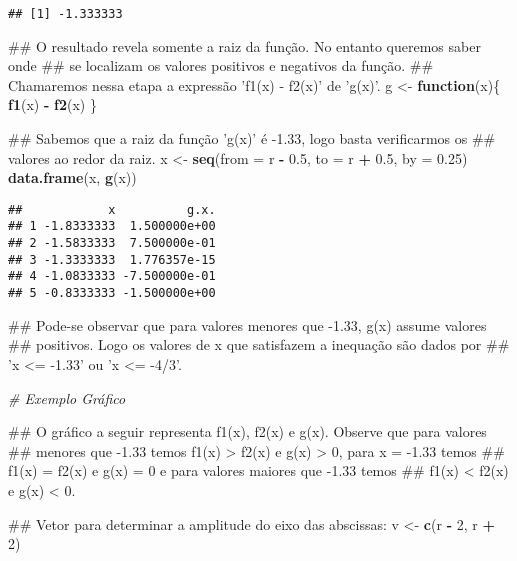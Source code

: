 \documentclass[]{book}
\newenvironment{Shaded}{\begin{snugshade}}{\end{snugshade}}
\newcommand{\KeywordTok}[1]{\textcolor[rgb]{0.13,0.29,0.53}{\textbf{#1}}}
\newcommand{\DataTypeTok}[1]{\textcolor[rgb]{0.13,0.29,0.53}{#1}}
\newcommand{\DecValTok}[1]{\textcolor[rgb]{0.00,0.00,0.81}{#1}}
\newcommand{\FloatTok}[1]{\textcolor[rgb]{0.00,0.00,0.81}{#1}}
\newcommand{\StringTok}[1]{\textcolor[rgb]{0.31,0.60,0.02}{#1}}
\newcommand{\CommentTok}[1]{\textcolor[rgb]{0.56,0.35,0.01}{\textit{#1}}}
\newcommand{\ControlFlowTok}[1]{\textcolor[rgb]{0.13,0.29,0.53}{\textbf{#1}}}
\newcommand{\OperatorTok}[1]{\textcolor[rgb]{0.81,0.36,0.00}{\textbf{#1}}}
\newcommand{\NormalTok}[1]{#1}
\begin{document}
\begin{enumerate}
\begin{verbatim}
## [1] -1.333333
\end{verbatim}

\begin{Shaded}
\begin{Highlighting}[]
\NormalTok{##  O resultado revela somente a raiz da função. No entanto queremos saber onde}
\NormalTok{## se localizam os valores positivos e negativos da função.}
\NormalTok{##  Chamaremos nessa etapa a expressão 'f1(x) - f2(x)' de 'g(x)'.}
\NormalTok{g <-}\StringTok{ }\ControlFlowTok{function}\NormalTok{(x)\{}
  \KeywordTok{f1}\NormalTok{(x) }\OperatorTok{-}\StringTok{ }\KeywordTok{f2}\NormalTok{(x)}
\NormalTok{\}}

\NormalTok{##  Sabemos que a raiz da função 'g(x)' é -1.33, logo basta verificarmos os}
\NormalTok{## valores ao redor da raiz.}
\NormalTok{x <-}\StringTok{ }\KeywordTok{seq}\NormalTok{(}\DataTypeTok{from =}\NormalTok{ r }\OperatorTok{-}\StringTok{ }\FloatTok{0.5}\NormalTok{, }\DataTypeTok{to =}\NormalTok{ r }\OperatorTok{+}\StringTok{ }\FloatTok{0.5}\NormalTok{, }\DataTypeTok{by =} \FloatTok{0.25}\NormalTok{)}
\KeywordTok{data.frame}\NormalTok{(x, }\KeywordTok{g}\NormalTok{(x))}
\end{Highlighting}
\end{Shaded}

\begin{verbatim}
##            x          g.x.
## 1 -1.8333333  1.500000e+00
## 2 -1.5833333  7.500000e-01
## 3 -1.3333333  1.776357e-15
## 4 -1.0833333 -7.500000e-01
## 5 -0.8333333 -1.500000e+00
\end{verbatim}

\begin{Shaded}
\begin{Highlighting}[]
\NormalTok{##  Pode-se observar que para valores menores que -1.33, g(x) assume valores}
\NormalTok{## positivos. Logo os valores de x que satisfazem a inequação são dados por}
\NormalTok{## 'x <= -1.33' ou 'x <= -4/3'.}

\CommentTok{# Exemplo Gráfico}

\NormalTok{##  O gráfico a seguir representa f1(x), f2(x) e g(x). Observe que para valores}
\NormalTok{## menores que -1.33 temos f1(x) > f2(x) e g(x) > 0, para x = -1.33 temos}
\NormalTok{## f1(x) = f2(x) e g(x) = 0 e para valores maiores que -1.33 temos}
\NormalTok{## f1(x) < f2(x) e g(x) < 0.}

\NormalTok{##  Vetor para determinar a amplitude do eixo das abscissas:}
\NormalTok{v <-}\StringTok{ }\KeywordTok{c}\NormalTok{(r }\OperatorTok{-}\StringTok{ }\DecValTok{2}\NormalTok{, r }\OperatorTok{+}\StringTok{ }\DecValTok{2}\NormalTok{)}


\end{Highlighting}
\end{Shaded}
\end{enumerate}
\end{document}
